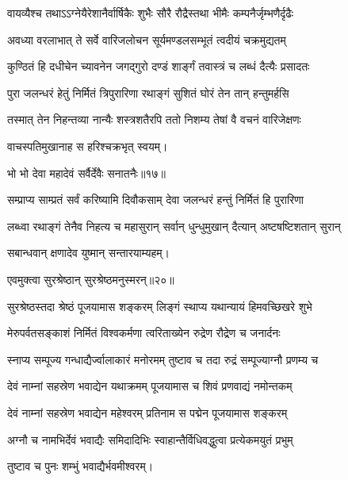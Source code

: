 \twolineshloka
{वायव्यैश्च तथाऽऽग्नेयैरेशानैर्वार्षिकैः शुभैः}
{सौरै रौद्रैस्तथा भीमैः कम्पनैर्जृम्भणैर्दृढैः} %

\twolineshloka
{अवध्या वरलाभात् ते सर्वे वारिजलोचन}
{सूर्यमण्डलसम्भूतं त्वदीयं चक्रमुद्यतम्} %

\twolineshloka
{कुण्ठितं हि दधीचेन च्यावनेन जगद्गुरो}
{दण्डं शार्ङ्गं तवास्त्रं च लब्धं दैत्यैः प्रसादतः} %

\twolineshloka
{पुरा जलन्धरं हेतुं निर्मितं त्रिपुरारिणा}
{रथाङ्गं सुशितं घोरं तेन तान् हन्तुमर्हसि} %

\twolineshloka
{तस्मात् तेन निहन्तव्या नान्यैः शस्त्रशतैरपि}
{ततो निशम्य तेषां वै वचनं वारिजेक्षणः} %


{वाचस्पतिमुखानाह स हरिश्चक्रभृत् स्वयम्।}

{भो भो देवा महादेवं सर्वैर्देवैः सनातनैः॥१७॥} %
\addtocounter{shlokacount}{1}

\twolineshloka
{सम्प्राप्य साम्प्रतं सर्वं करिष्यामि दिवौकसाम्}
{देवा जलन्धरं हन्तुं निर्मितं हि पुरारिणा} %

\twolineshloka
{लब्ध्वा रथाङ्गं तेनैव निहत्य च महासुरान्}
{सर्वान् धुन्धुमुखान् दैत्यान् अष्टषष्टिशतान् सुरान्} %

{सबान्धवान् क्षणादेव युष्मान् सन्तारयाम्यहम्।}


{एवमुक्त्वा सुरश्रेष्ठान् सुरश्रेष्ठमनुस्मरन्॥२०॥} %

\addtocounter{shlokacount}{1}

\twolineshloka
{सुरश्रेष्ठस्तदा श्रेष्ठं पूजयामास शङ्करम्}
{लिङ्गं स्थाप्य यथान्यायं हिमवच्छिखरे शुभे} %

\twolineshloka
{मेरुपर्वतसङ्काशं निर्मितं विश्वकर्मणा}
{त्वरिताख्येन रुद्रेण रौद्रेण च जनार्दनः} %

\twolineshloka
{स्नाप्य सम्पूज्य गन्धाद्यैर्ज्वालाकारं मनोरमम्}
{तुष्टाव च तदा रुद्रं सम्पूज्याग्नौ प्रणम्य च} %

\twolineshloka
{देवं नाम्नां सहस्रेण भवाद्येन यथाक्रमम्}
{पूजयामास च शिवं प्रणवाद्यं नमोन्तकम्} %

\twolineshloka
{देवं नाम्नां सहस्रेण भवाद्येन महेश्वरम्}
{प्रतिनाम स पद्मेन पूजयामास शङ्करम्} %

\twolineshloka
{अग्नौ च नामभिर्देवं भवाद्यैः समिदादिभिः}
{स्वाहान्तैर्विधिवद्धुत्वा प्रत्येकमयुतं प्रभुम्} %

तुष्टाव च पुनः शम्भुं भवाद्यैर्भवमीश्वरम्।


